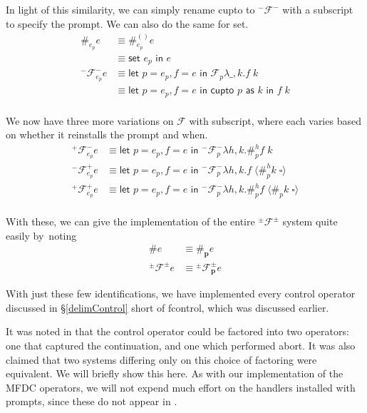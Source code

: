 \documentclass[11pt]{article}
\newcommand{\letin}[2]{\textsf{let }#1\textsf{ in }#2}
\newcommand\F{\mathcal{F}}
\newcommand\pmFpm{^\pm\F^\pm}
\newcommand{\angles}[1]{\langle#1\rangle}
\begin{document}
In light of this similarity, we can simply rename cupto to $^-\F^-$ with a subscript to specify the prompt.
We can also do the same for \textsf{set}.
\begin{align*}
\#_{e_p}e &\equiv \#_{e_p}^{()}e \\
	&\equiv \textsf{set }e_p\textsf{ in }e \\
^-\F^-_{e_p}e &\equiv
	\letin{p = e_p,f=e}{\F_{p}\lambda \_,k.f\;k} \\
	&\equiv \letin{p=e_p,f=e}{\textsf{cupto }p\textsf{ as }k\textsf{ in }f\;k} \\
\end{align*}

We now have three more variations on $\F$ with subscript, where each varies based on whether it reinstalls the prompt and when.
\begin{align*}
^+\F^-_{e_p}e &\equiv
	\letin{p=e_p,f=e}{^-\F_{p}^-\lambda h,k.\#_{p}^hf\;k} \\
^-\F^+_{e_p}e &\equiv
	\letin{p=e_p,f=e}{^-\F_{p}^-\lambda h,k.f\;\angles{\#_{p}^hk\;\square}} \\
^+\F^+_{e_p}e &\equiv
	\letin{p=e_p,f=e}{^-\F_{p}^-\lambda h,k.\#_{p}^hf\;\angles{\#_{p}k\;\square}} \\
\end{align*}

\newpage
With these, we can give the implementation of the entire $\pmFpm$ system quite easily by~noting 
\begin{align*}
\#e &\equiv \#_\mathbf{p}e \\
\pmFpm e &\equiv{} \pmFpm_\mathbf{p}e
\end{align*}

With just these few identifications, we have implemented every control operator discussed in \S\ref{delimControl} short of fcontrol, which was discussed earlier.


It was noted in \cite{MFDC} that the control operator could be factored into two operators: one that captured the continuation, and one which performed abort.
It was also claimed that two systems differing only on this choice of factoring were equivalent.
We will briefly show this here.
As with our implementation of the MFDC operators, we will not expend much effort on the handlers installed with prompts, since these do not appear in \cite{MFDC}.
\end{document}
